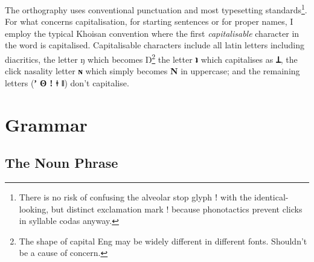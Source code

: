 \documentclass[11pt,a5paper]{book}
\newcommand{\qcn}[1]{\textcolor{AccentText}{\large\textbf{#1}}}
\begin{document}
The orthography uses conventional punctuation and most typesetting standards\footnote{There is no risk of confusing the alveolar stop glyph ǃ with the identical-looking, but distinct exclamation mark ! because phonotactics prevent clicks in syllable codas anyway.}. For what concerns capitalisation, for starting sentences or for proper names, I employ the typical Khoisan convention where the first \emph{capitalisable} character in the word is capitalised. Capitalisable characters include all latin letters including diacritics, the letter ŋ which becomes Ŋ\footnote{The shape of capital Eng may be widely different in different fonts. Shouldn't be a cause of concern.} the letter \qcn{ʇ} which capitalises as \qcn{Ʇ}, the click nasality letter \qcn{ɴ} which simply becomes \qcn{N} in uppercase; and the remaining letters (\qcn{ʼ ʘ ǃ ǂ ǁ}) don't capitalise. 

%

\chapter{Grammar}

\section{The Noun Phrase}
\end{document}
